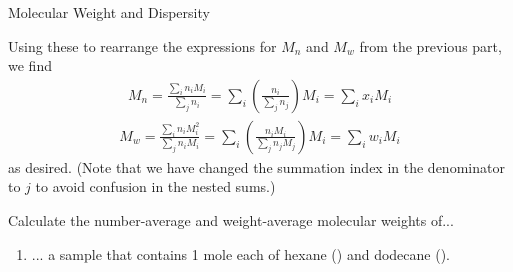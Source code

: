 \begin{activity}{Molecular Weight and Dispersity}
\begin{exercises}
\begin{enumerate}
\begin{solution}
{						Using these to rearrange the expressions for $M_n$ and $M_w$ from the previous part, we find
	\begin{align*}
		M_n = \frac{\sum_i  n_i M_i}{\sum_j n_i}
			= \sum_i \left(\frac{n_i}{\sum_j n_j}\right) M_i
			= \sum_i x_i M_i
	\end{align*}
	\begin{align*}
		M_w = \frac{\sum_i n_i M_i^2 }{\sum_j n_i M_i}
			= \sum_i \left(\frac{n_i M_i}{\sum_j n_j M_j}\right) M_i
			= \sum_i w_i M_i
	\end{align*}
	as desired.  (Note that we have changed the summation index in the denominator to $j$ to avoid confusion in the nested sums.)
						
					}\end{solution}
				
			\end{enumerate}
			
		\exercise Calculate the number-average and weight-average molecular weights of...
		
			\begin{enumerate}
			
				\item ... a sample that contains 1 mole each of hexane () and dodecane ().
					
					\begin{solution}\end{solution}
				

\end{enumerate}
\end{exercises}
\end{activity}
